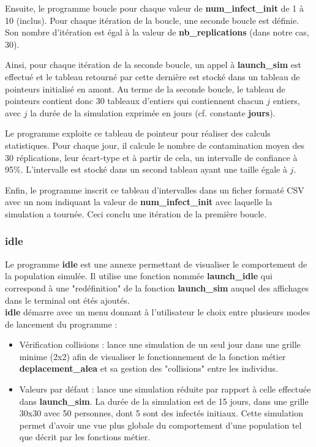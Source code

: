 \documentclass[12pt,french,titlepage]{article}
\begin{document}
Ensuite, le programme boucle pour chaque valeur de \textbf{num\_infect\_init} de 1 à 10 (inclus). Pour chaque itération de la boucle, une seconde boucle est définie. Son nombre d'itération est égal à la valeur de \textbf{nb\_replications} (dans notre cas, 30). 

Ainsi, pour chaque itération de la seconde boucle, un appel à \textbf{launch\_sim} est effectué et le tableau retourné par cette dernière est stocké dans un tableau de pointeurs initialisé en amont. Au terme de la seconde boucle, le tableau de pointeurs contient donc 30 tableaux d'entiers qui contiennent chacun $j$ entiers, avec $j$ la durée de la simulation exprimée en jours (cf. constante \textbf{jours}).

\newpage

Le programme exploite ce tableau de pointeur pour réaliser des calculs statistiques. Pour chaque jour, il calcule le nombre de contamination moyen des 30 réplications, leur écart-type et à partir de cela, un intervalle de confiance à 95\%. L'intervalle est stocké dans un second tableau ayant une taille égale à $j$.

Enfin, le programme inscrit ce tableau d'intervalles dans un ficher formaté CSV avec un nom indiquant la valeur de \textbf{num\_infect\_init} avec laquelle la simulation a tournée. Ceci conclu une itération de la première boucle.

\subsubsection{idle}
Le programme \textbf{idle} est une annexe permettant de visualiser le comportement de la population simulée. Il utilise une fonction nommée \textbf{launch\_idle} qui correspond à une "redéfinition" de la fonction \textbf{launch\_sim} auquel des affichages dans le terminal ont étés ajoutés.\\

\textbf{idle} démarre avec un menu donnant à l'utilisateur le choix entre plusieurs modes de lancement du programme :
\begin{itemize}
\item Vérification collisions : lance une simulation de un seul jour dans une grille minime (2x2) afin de visualiser le fonctionnement de la fonction métier \textbf{deplacement\_alea} et sa gestion des "collisions" entre les individus.

\item Valeurs par défaut : lance une simulation réduite par rapport à celle effectuée dans \textbf{launch\_sim}. La durée de la simulation est de 15 jours, dans une grille 30x30 avec 50 personnes, dont 5 sont des infectés initiaux. Cette simulation permet d'avoir une vue plus globale du comportement d'une population tel que décrit par les fonctions métier.\\
\end{itemize}
\end{document}
